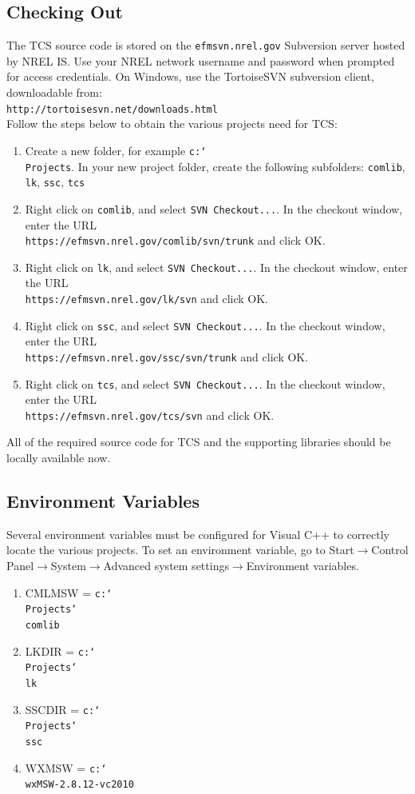 \documentclass{article}
\newcommand\bslash{\char`\\}
\begin{document}
\subsection{Checking Out}
The TCS source code is stored on the \texttt{efmsvn.nrel.gov} Subversion server hosted by NREL IS.  Use your NREL network username and password when prompted for access credentials.  On Windows, use the TortoiseSVN subversion client, downloadable from:\\
\texttt{http://tortoisesvn.net/downloads.html}
\\Follow the steps below to obtain the various projects need for TCS:
\begin{enumerate}
\item Create a new folder, for example \texttt{c:\bslash Projects}. In your new project folder, create the following subfolders: \texttt{comlib}, \texttt{lk}, \texttt{ssc}, \texttt{tcs}
\item Right click on \texttt{comlib}, and select \texttt{SVN Checkout...}.  In the checkout window, enter the URL\\
\texttt{https://efmsvn.nrel.gov/comlib/svn/trunk} and click OK.

\item Right click on \texttt{lk}, and select \texttt{SVN Checkout...}. In the checkout window, enter the URL\\
\texttt{https://efmsvn.nrel.gov/lk/svn} and click OK.

\item Right click on \texttt{ssc}, and select \texttt{SVN Checkout...}. In the checkout window, enter the URL\\
\texttt{https://efmsvn.nrel.gov/ssc/svn/trunk} and click OK.

\item Right click on \texttt{tcs}, and select \texttt{SVN Checkout...}. In the checkout window, enter the URL\\
\texttt{https://efmsvn.nrel.gov/tcs/svn} and click OK.
\end{enumerate}
All of the required source code for TCS and the supporting libraries should be locally available now.

\subsection{Environment Variables}
Several environment variables must be configured for Visual C++ to correctly locate the various projects. To set an environment variable, go to Start$\rightarrow$Control Panel$\rightarrow$System$\rightarrow$Advanced system settings$\rightarrow$Environment variables.
\begin{enumerate}
\item CMLMSW = \texttt{c:\bslash Projects\bslash comlib}
\item LKDIR = \texttt{c:\bslash Projects\bslash lk}
\item SSCDIR = \texttt{c:\bslash Projects\bslash ssc}
\item WXMSW = \texttt{c:\bslash wxMSW-2.8.12-vc2010}
\end{enumerate}
\end{document}
